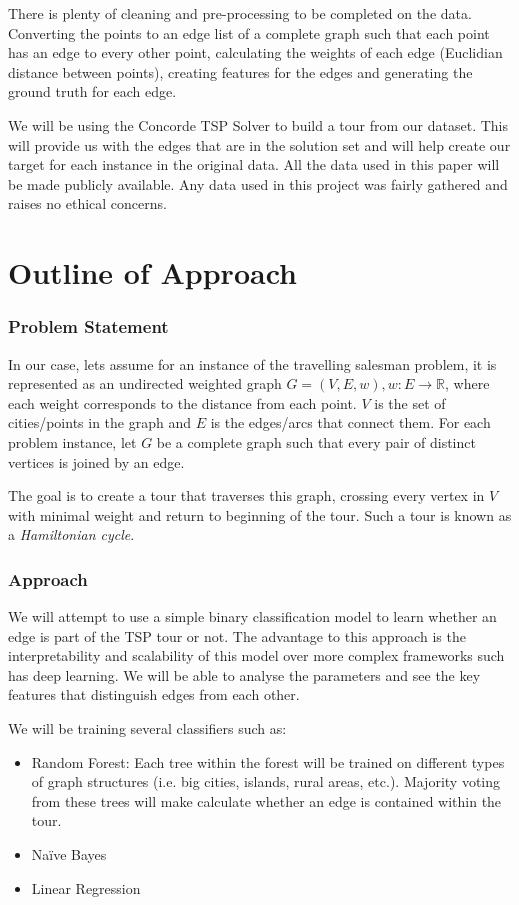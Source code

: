 \documentclass[]{UCD_CS_FYP_Report}
\begin{document}
There is plenty of cleaning and pre-processing to be completed on the data. Converting the points to an edge list of a complete graph such that each point has an edge to every other point, calculating the weights of each edge (Euclidian distance between points), creating features for the edges and generating the ground truth for each edge.

We will be using the Concorde TSP Solver \cite{davidapplegate2007} to build a tour from our dataset. This will provide us with the edges that are in the solution set and will help create our target for each instance in the original data.
All the data used in this paper will be made publicly available. Any data used in this project was fairly gathered and raises no ethical concerns.


\chapter{Outline of Approach}
\subsection{Problem Statement}
In our case, lets assume for an instance of the travelling salesman problem, it is represented as an undirected weighted graph $G = (V, E, w), w:E\to\mathbb{R}$, where each weight corresponds to the distance from each point. $V$ is the set of cities/points in the graph and $E$ is the edges/arcs that connect them. For each problem instance, let $G$ be a complete graph such that every pair of distinct vertices is joined by an edge.

The goal is to create a tour that traverses this graph, crossing every vertex in $V$ with minimal weight and return to beginning of the tour. Such a tour is known as a \textit{Hamiltonian cycle}.

\subsection{Approach}
We will attempt to use a simple binary classification model to learn whether an edge is part of the TSP tour or not. The advantage to this approach is the interpretability and scalability of this model over more complex frameworks such has deep learning. We will be able to analyse the parameters and see the key features that distinguish edges from each other.

We will be training several classifiers such as:
\begin{itemize}
    \item Random Forest: Each tree within the forest will be trained on different types of graph structures (i.e. big cities, islands, rural areas, etc.). Majority voting from these trees will make calculate whether an edge is contained within the tour. 
    \item Naïve Bayes
    \item Linear Regression
\end{itemize}
\end{document}
